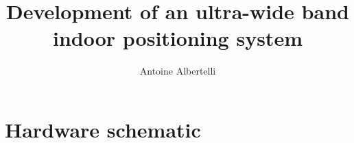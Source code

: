 \documentclass[a4paper]{scrreprt}
\title{Development of an ultra-wide band indoor positioning system}
\author{Antoine Albertelli}
\begin{document}
\maketitle
\tableofcontents

\appendix
\chapter{Hardware schematic}



\clearpage
\nocite{*} %


\end{document}
